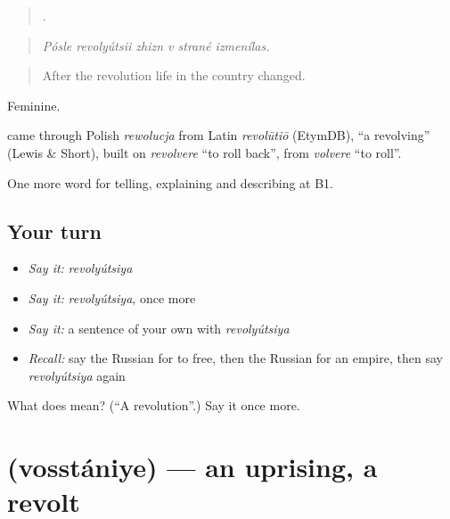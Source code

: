 \begin{quote}
     .
\end{quote}

\begin{quote}
\emph{Pósle revolyútsii zhizn v strané izmenílas.}
\end{quote}

\begin{quote}
After the revolution life in the country changed.
\end{quote}

Feminine.

\begin{cousinweb}
\emph{} came through Polish \emph{rewolucja} from Latin \emph{revolūtiō} (EtymDB), \textquotedblleft{}a revolving\textquotedblright{} (Lewis \& Short), built on \emph{revolvere} \textquotedblleft{}to roll back\textquotedblright{}, from \emph{volvere} \textquotedblleft{}to roll\textquotedblright{}.
\end{cousinweb}

\begin{grammarlens}[title={What you've built}]
One more word for telling, explaining and describing at B1.
\end{grammarlens}

\subsection*{Your turn}
\begin{itemize}
\raggedright
  \item \emph{Say it:} \emph{revolyútsiya}
  \item \emph{Say it:} \emph{revolyútsiya}, once more
  \item \emph{Say it:} a sentence of your own with \emph{revolyútsiya}
  \item \emph{Recall:} say the Russian for to free, then the Russian for an empire, then say \emph{revolyútsiya} again
\end{itemize}

\begin{tcolorbox}[breakable,colback=teal!4,colframe=teal!35!black,title={Before you move on}]
What does  mean? (\textquotedblleft{}A revolution\textquotedblright{}.) Say it once more.
\end{tcolorbox}
\section[\texorpdfstring{\ru{восстание} (vosstániye)}{восстание (vosstániye)}]{ (vosstániye) — an uprising, a revolt}

